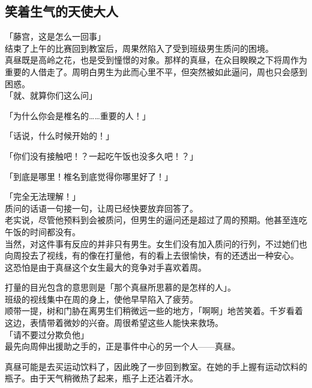 \subsection{笑着生气的天使大人}

「藤宫，这是怎么一回事」\\

结束了上午的比赛回到教室后，周果然陷入了受到班级男生质问的困境。\\

真昼既是高岭之花，也是受到憧憬的对象。那样的真昼，在众目睽睽之下将周作为重要的人借走了。周明白男生为此而心里不平，但突然被如此逼问，周也只会感到困惑。\\

「就、就算你们这么问」

「为什么你会是椎名的……重要的人！」

「话说，什么时候开始的！」

「你们没有接触吧！？一起吃午饭也没多久吧！？」

「到底是哪里！椎名到底觉得你哪里好了！」

「完全无法理解！」\\

质问的话语一句接一句，让周已经快要放弃回答了。\\

老实说，尽管他预料到会被质问，但男生的逼问还是超过了周的预期。他甚至连吃午饭的时间都没有。\\

当然，对这件事有反应的并非只有男生。女生们没有加入质问的行列，不过她们也向周投去了视线，有的像在打量他，有的看上去很愉快，有的还透出一种安心。\\

这恐怕是由于真昼这个女生最大的竞争对手喜欢着周。

打量的目光包含的意思则是「那个真昼所思慕的是怎样的人」。\\

班级的视线集中在周的身上，使他早早陷入了疲劳。\\

顺带一提，树和门胁在离男生们稍微远一些的地方，「啊啊」地苦笑着。千岁看着这边，表情带着微妙的兴奋。周很希望这些人能快来救场。\\

「请不要过分欺负他」\\

最先向周伸出援助之手的，正是事件中心的另一个人——真昼。

真昼可能是去买运动饮料了，因此晚了一步回到教室。在她的手上握有运动饮料的瓶子。由于天气稍微热了起来，瓶子上还沾着汗水。\\

